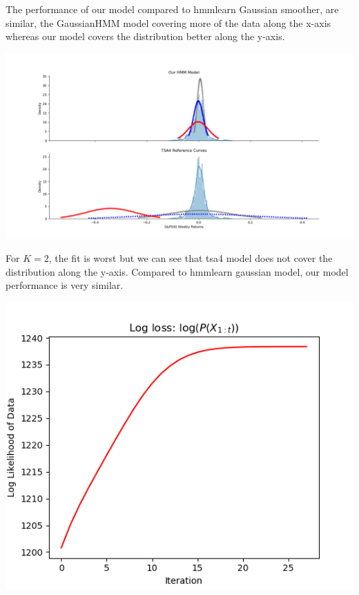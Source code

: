 \documentclass[12pt]{article}
\begin{document}
The performance of our model compared to hmmlearn Gaussian smoother,  are similar, the GaussianHMM model covering more of the data along the x-axis whereas our model covers the
distribution better along the y-axis.
\begin{center}
	\includegraphics[width=1\linewidth]{figures/problem-3-3.png} 
\end{center}

For $K=2$, the fit is worst but we can see that tsa4 model does not cover the distribution along the y-axis. Compared to hmmlearn gaussian model, our model performance is very similar.

\begin{center}
	\includegraphics[width=1\linewidth]{figures/problem-3-5.png} 
\end{center}
\end{document}
